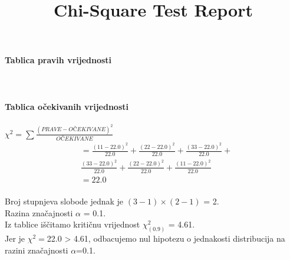 \documentclass{article}%
\begin{document}
%
\normalsize%
\title{Chi-Square Test Report}%
\renewcommand{\arraystretch}{1.5}%
\textbf{\huge Tablica pravih vrijednosti\\}%
%
\\\\\\%
\renewcommand{\arraystretch}{1.5}%
\textbf{\huge Tablica očekivanih vrijednosti}\\%
%
\vspace{10pt}%
\\[1em]%
\Large $\chi^2 = \sum \frac{(PRAVE - OČEKIVANE)^2}{OČEKIVANE}$%
\\[1em]%
\begin{equation*}%
\begin{aligned}%
&=%
 \frac{(11 - 22.0)^2}{22.0} +%
 \frac{(22 - 22.0)^2}{22.0} +%
 \frac{(33 - 22.0)^2}{22.0} + \\&%
 \frac{(33 - 22.0)^2}{22.0} +%
 \frac{(22 - 22.0)^2}{22.0} +%
 \frac{(11 - 22.0)^2}{22.0} \\&%
=22.0%
\end{aligned}%
\end{equation*}%
\vspace{10pt}%
\\[1em]%
\Large Broj stupnjeva slobode jednak je $(3 - 1) \times (2 - 1)$ = 2.%
\\%
\Large Razina značajnosti $\alpha$ = 0.1.%
\\%
\Large Iz tablice iščitamo kritičnu vrijednost $\chi^2_{(0.9)}$ = 4.61.%
\\%
\Large Jer je $\chi^2=$22.0 > 4.61, odbacujemo nul hipotezu o jednakosti distribucija na razini značajnosti $\alpha$=0.1.%
\end{document}
